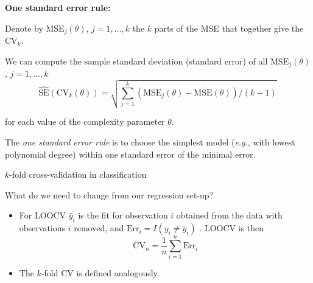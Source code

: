 \documentclass[10pt,ignorenonframetext,]{beamer}
\begin{document}
\begin{frame}

\textbf{One standard error rule:}

Denote by \(\text{MSE}_j(\theta)\), \(j=1,\ldots, k\) the \(k\) parts of
the MSE that together give the \(\text{CV}_k\).

We can compute the sample standard deviation (standard error) of all
\(\text{MSE}_j(\theta)\), \(j=1,\ldots, k\)
\[\hat{\text{SE}}(\text{CV}_k(\theta))= \sqrt{\sum_{j=1}^k (\text{MSE}_j(\theta) - \overline{\text{MSE}}(\theta))/(k-1)} \, \]

for each value of the complexity parameter \(\theta\).

The \emph{one standard error rule} is to choose the simplest model
(\emph{e.g.}, with lowest polynomial degree) within one standard error
of the minimal error.

\end{frame}

\begin{frame}

\begin{block}{\(k\)-fold cross-validation in classification}

\vspace{3mm}

What do we need to change from our regression set-up?

\vspace{3mm}

\begin{itemize}
\item
  For LOOCV \(\hat{y}_i\) is the fit for observation \(i\) obtained from
  the data with observations \(i\) removed, and
  \({\text{Err}_i}=I(y_i\neq \hat{y}_i)\) . LOOCV is then
  \[\text{CV}_{n}=\frac{1}{n} \sum_{i=1}^n {\text{Err}_i}\]
\item
  The \(k\)-fold CV is defined analogously.
\end{itemize}

\end{block}

\end{frame}
\end{document}
